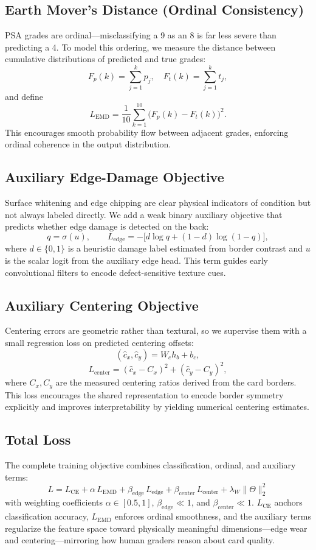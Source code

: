 \documentclass[12pt]{article}
\begin{document}
\subsection{Earth Mover's Distance (Ordinal Consistency)}
PSA grades are ordinal---misclassifying a 9 as an 8 is far less severe than predicting a 4. 
To model this ordering, we measure the distance between cumulative distributions of predicted and true grades:
\[
F_p(k)=\sum_{j=1}^{k}p_j, \quad F_t(k)=\sum_{j=1}^{k}t_j,
\]
and define
\[
L_{\text{EMD}} = \frac{1}{10}\sum_{k=1}^{10}\big(F_p(k)-F_t(k)\big)^2.
\]
This encourages smooth probability flow between adjacent grades, enforcing ordinal coherence in the output distribution.

\subsection{Auxiliary Edge-Damage Objective}
Surface whitening and edge chipping are clear physical indicators of condition but not always labeled directly. 
We add a weak binary auxiliary objective that predicts whether edge damage is detected on the back:
\[
q = \sigma(u), \qquad 
L_{\text{edge}} = -\big[d\log q + (1-d)\log(1-q)\big],
\]
where $d \in \{0,1\}$ is a heuristic damage label estimated from border contrast and $u$ is the scalar logit from the auxiliary edge head.
This term guides early convolutional filters to encode defect-sensitive texture cues.

\subsection{Auxiliary Centering Objective}
Centering errors are geometric rather than textural, so we supervise them with a small regression loss on predicted centering offsets:
\[
(\hat{c}_x,\hat{c}_y) = W_c h_b + b_c,
\]
\[
L_{\text{center}} = (\hat{c}_x - C_x)^2 + (\hat{c}_y - C_y)^2,
\]
where $C_x,C_y$ are the measured centering ratios derived from the card borders.
This loss encourages the shared representation to encode border symmetry explicitly and improves interpretability by yielding numerical centering estimates.

\subsection{Total Loss}
The complete training objective combines classification, ordinal, and auxiliary terms:
\[
\boxed{
L = L_{\text{CE}}
   + \alpha\,L_{\text{EMD}}
   + \beta_{\text{edge}}\,L_{\text{edge}}
   + \beta_{\text{center}}\,L_{\text{center}}
   + \lambda_W \|\Theta\|_2^2
}
\]
with weighting coefficients $\alpha \!\in\! [0.5,1]$, $\beta_{\text{edge}} \!\ll\! 1$, and $\beta_{\text{center}} \!\ll\! 1$.
$L_{\text{CE}}$ anchors classification accuracy, $L_{\text{EMD}}$ enforces ordinal smoothness, 
and the auxiliary terms regularize the feature space toward physically meaningful dimensions---edge wear and centering---mirroring how human graders reason about card quality.
\end{document}
